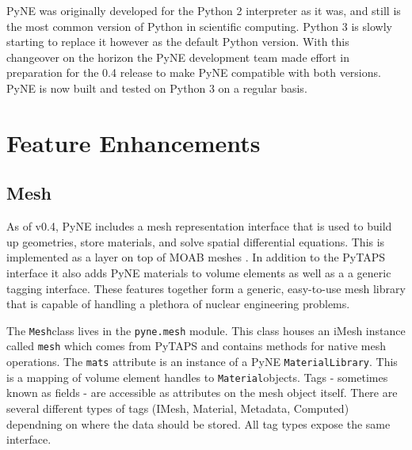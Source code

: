 \documentclass{anstrans}
\newcommand{\Mesh}{\texttt{Mesh}}
\newcommand{\Material}{\texttt{Material}}
\begin{document}
PyNE was originally developed for the Python 2 interpreter as it was, and still is the most common version of Python in scientific computing. Python 3 is slowly starting to replace it however as the default Python version. With this changeover on the horizon the PyNE development team made effort in preparation for the 0.4 release to make PyNE compatible with both versions. PyNE is now built and tested on Python 3 on a regular basis.

\section{Feature Enhancements}

\subsection{Mesh}

%
%

As of v0.4, PyNE includes a mesh representation interface that is used to 
build up geometries, store materials, and solve spatial differential equations.
This is implemented as a layer on top of MOAB meshes \cite{tautges_moab:_2004}.
In addition to the PyTAPS interface \cite{pytaps} it also adds PyNE materials to 
volume elements as well as a a generic tagging interface. These features together 
form a generic, easy-to-use mesh library that is capable of handling a plethora
of nuclear engineering problems.

The \Mesh class lives in the \texttt{pyne.mesh} module. This class houses an 
iMesh instance called \texttt{mesh} which comes from PyTAPS and contains 
methods for native mesh operations. The \texttt{mats} attribute is an 
instance of a PyNE \texttt{MaterialLibrary}. This is a mapping of volume 
element handles to \Material objects. Tags - sometimes known as fields - are 
accessible as attributes on the mesh object itself. There are several different types
of tags (IMesh, Material, Metadata, Computed) dependning on where the data should
be stored.  All tag types expose the same interface. 
\end{document}
